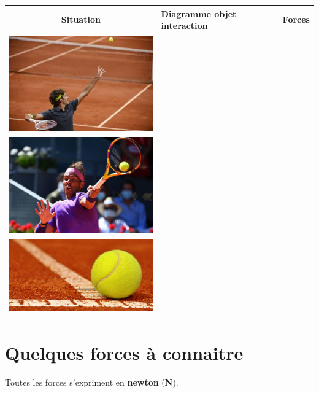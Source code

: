 \documentclass[12pt,a4paper,fleqn]{article}
\begin{document}
\begin{landscape}
\begin{center}
\begin{tabular}[c]{|c| >{\centering}m{.3\linewidth} | >{\centering\arraybackslash}m{.3\linewidth} |}
\hline
\textbf{Situation} & \textbf{Diagramme objet interaction} & \textbf{Forces} \\
\hline
\includegraphics[trim=0 0 50 -13, clip, width=200pt]{images/tennis_service.png} & & \\
\hline
\includegraphics[trim=50 0 0 -13, clip, width=200pt]{images/tennis_raquette.jpg} & & \\
\hline 
\includegraphics[trim=125 0 0 -8, clip, width=200pt]{images/tennis_sol.jpg} & & \\
\hline
\end{tabular}
\end{center}
\end{landscape}

\section{Quelques forces à connaitre}

Toutes les forces s'expriment en \textbf{newton} (\textbf{N}).
\end{document}
